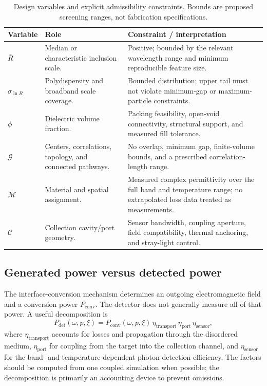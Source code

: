 \documentclass[10.5pt,a4paper]{article}
\begin{document}
\begin{table}[H]
\centering\small
\caption{Design variables and explicit admissibility constraints. Bounds are proposed screening ranges, not fabrication specifications.}
\begin{tabularx}{\textwidth}{p{}p{}Y}
\toprule
Variable & Role & Constraint / interpretation\\
\midrule
$\bar R$ & Median or characteristic inclusion scale. & Positive; bounded by the relevant wavelength range and minimum reproducible feature size.\\
$\sigma_{\ln R}$ & Polydispersity and broadband scale coverage. & Bounded distribution; upper tail must not violate minimum-gap or maximum-particle constraints.\\
$\phi$ & Dielectric volume fraction. & Packing feasibility, open-void connectivity, structural support, and measured fill tolerance.\\
$\mathcal G$ & Centers, correlations, topology, and connected pathways. & No overlap, minimum gap, finite-volume bounds, and a prescribed correlation-length range.\\
$\mathcal M$ & Material and spatial assignment. & Measured complex permittivity over the full band and temperature range; no extrapolated loss data treated as measurements.\\
$\mathcal C$ & Collection cavity/port geometry. & Sensor bandwidth, coupling aperture, field compatibility, thermal anchoring, and stray-light control.\\
\bottomrule
\end{tabularx}
\end{table}

\subsection{Generated power versus detected power}
The interface-conversion mechanism determines an outgoing electromagnetic field and a conversion power $P_{\mathrm{conv}}$. The detector does not generally measure all of that power. A useful decomposition is
\begin{equation}
P_{\mathrm{det}}(\omega,p,\xi)=P_{\mathrm{conv}}(\omega,p,\xi)\,\eta_{\mathrm{transport}}\,\eta_{\mathrm{port}}\,\eta_{\mathrm{sensor}},
\label{eq:pdet}
\end{equation}
where $\eta_{\mathrm{transport}}$ accounts for losses and propagation through the disordered medium, $\eta_{\mathrm{port}}$ for coupling from the target into the collection channel, and $\eta_{\mathrm{sensor}}$ for the band- and temperature-dependent photon detection efficiency. The factors should be computed from one coupled simulation when possible; the decomposition is primarily an accounting device to prevent omissions.
\end{document}
